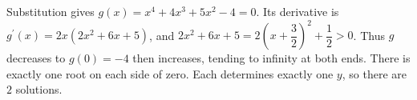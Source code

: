 Substitution gives $g(x)=x^4+4x^3+5x^2-4=0$. Its derivative is $g^{\prime}(x)=2x(2x^2+6x+5)$, and $2x^2+6x+5=2(x+\dfrac{3}{2})^2+\dfrac{1}{2}>0$. Thus $g$ decreases to $g(0)=-4$ then increases, tending to infinity at both ends. There is exactly one root on each side of zero. Each determines exactly one $y$, so there are $\boxed2$ solutions.
